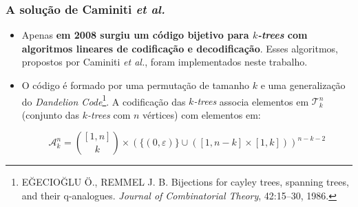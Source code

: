 \documentclass{beamer}
\begin{document}
  \begin{frame}
    \frametitle{A solução de Caminiti \emph{et al.}}

    \begin{itemize}
      \item Apenas \textbf{em 2008 surgiu um código bijetivo para \emph{$k$-trees} com algoritmos lineares de codificação e decodificação}. Esses algoritmos, propostos por Caminiti \emph{et al.}, foram implementados neste trabalho.
      \item O código é formado por uma permutação de tamanho $k$ e uma generalização do \emph{Dandelion Code}\footnote{\scriptsize EĞECIOĞLU Ö., REMMEL J. B. Bijections for cayley trees, spanning trees, and their q-analogues. \emph{Journal of Combinatorial Theory}, 42:15--30, 1986.}. A codificação das \emph{$k$-trees} associa elementos em $\mathcal{T}^n_k$ (conjunto das \emph{$k$-trees} com $n$ vértices) com elementos em:

        $$
        \mathcal{A}^n_k = { [1,n] \choose k } \times (\{ ( 0, \varepsilon ) \} \cup ([1,n-k] \times [1,k]))^{n-k-2}
        $$
    \end{itemize}
  \end{frame}
\end{document}
